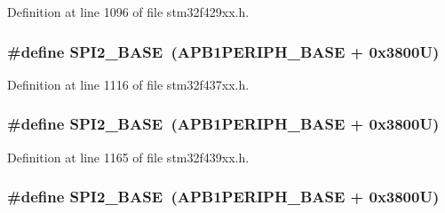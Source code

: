 Definition at line 1096 of file stm32f429xx.\+h.

\subsubsection[{\texorpdfstring{S\+P\+I2\+\_\+\+B\+A\+SE}{SPI2_BASE}}]{\setlength{\rightskip}{0pt plus 5cm}\#define S\+P\+I2\+\_\+\+B\+A\+SE~({\bf A\+P\+B1\+P\+E\+R\+I\+P\+H\+\_\+\+B\+A\+SE} + 0x3800\+U)}\hypertarget{group___peripheral__memory__map_gac3e357b4c25106ed375fb1affab6bb86}{}\label{group___peripheral__memory__map_gac3e357b4c25106ed375fb1affab6bb86}


Definition at line 1116 of file stm32f437xx.\+h.

\subsubsection[{\texorpdfstring{S\+P\+I2\+\_\+\+B\+A\+SE}{SPI2_BASE}}]{\setlength{\rightskip}{0pt plus 5cm}\#define S\+P\+I2\+\_\+\+B\+A\+SE~({\bf A\+P\+B1\+P\+E\+R\+I\+P\+H\+\_\+\+B\+A\+SE} + 0x3800\+U)}\hypertarget{group___peripheral__memory__map_gac3e357b4c25106ed375fb1affab6bb86}{}\label{group___peripheral__memory__map_gac3e357b4c25106ed375fb1affab6bb86}


Definition at line 1165 of file stm32f439xx.\+h.

\subsubsection[{\texorpdfstring{S\+P\+I2\+\_\+\+B\+A\+SE}{SPI2_BASE}}]{\setlength{\rightskip}{0pt plus 5cm}\#define S\+P\+I2\+\_\+\+B\+A\+SE~({\bf A\+P\+B1\+P\+E\+R\+I\+P\+H\+\_\+\+B\+A\+SE} + 0x3800\+U)}\hypertarget{group___peripheral__memory__map_gac3e357b4c25106ed375fb1affab6bb86}{}\label{group___peripheral__memory__map_gac3e357b4c25106ed375fb1affab6bb86}


